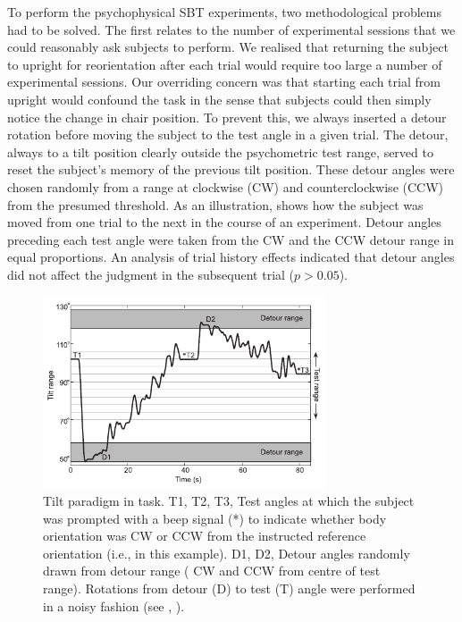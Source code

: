 To perform the psychophysical SBT experiments, two methodological problems had to be solved. The first relates to the number of experimental sessions that we could reasonably ask subjects to perform. We realised that returning the subject to upright for reorientation after each trial would require too large a number of experimental sessions. Our overriding concern was that starting each trial from upright would confound the  task in the sense that subjects could then simply notice the change in chair position. To prevent this, we always inserted a detour rotation before moving the subject to the test angle in a given trial. The detour, always to a tilt position clearly outside the psychometric test range, served to reset the subject's memory of the previous tilt position. These detour angles were chosen randomly from a range at  clockwise (CW) and counterclockwise (CCW) from the presumed threshold. As an illustration,  shows how the subject was moved from one trial to the next in the course of an  experiment. Detour angles preceding each test angle were taken from the CW and the CCW detour range in equal proportions. An analysis of trial history effects indicated that detour angles did not affect the judgment in the subsequent trial ($p > 0.05$).

\begin{figure}
    \includegraphics[width=0.75\textwidth]{src/paper1/figure2.pdf}

    \caption{Tilt paradigm in  task. T1, T2, T3, Test angles at which the subject was prompted with a beep signal (*) to indicate whether body orientation was CW or CCW from the instructed reference orientation (i.e.,  in this example). D1, D2, Detour angles randomly drawn from detour range ( CW and CCW from centre of test range). Rotations from detour (D) to test (T) angle were performed in a noisy fashion (see , ).}
    \label{p1:fig2}
\end{figure}

